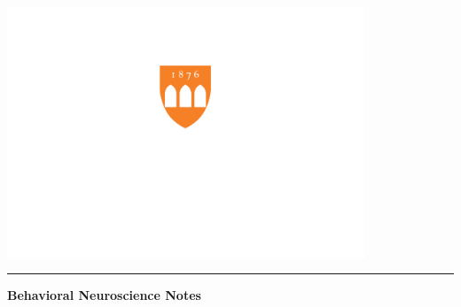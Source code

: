 \documentclass[12pt, oneside]{book}
\newcounter{BoxCounter}
\begin{document}



\newcommand{\titlestandin}[0]{Behavioral Neuroscience Notes}
\newcommand{\cussubtitle}[0]{PSYC 360}
\newcommand{\startdate}[0]{January 21, 2025}
\newcommand{\customenddate}[0]{May 14, 2025}
\newcommand{\professor}[0]{Prof. Jennifer Peszka, Ph.D.}




\begin{titlepage}
    \begin{center}

        \vspace*{-2cm}
        \includegraphics[width=0.8\textwidth]{images/logo_white_text.png}\\ %
        \vfill

        \textcolor{horange}{\rule{\textwidth}{1.0pt}}

        \vspace{2em}

        {\huge \textbf{\titlestandin}}

        \vspace{1em} %


\end{center}
\end{titlepage}
\end{document}
